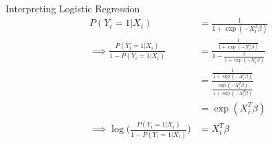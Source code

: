 \documentclass{clbeamer2024}
\begin{document}
\begin{frame}{Interpreting Logistic Regression}
    \begin{equation*}
    \begin{split}
        P(Y_i = 1 | X_i) & = \frac{1}{1 + \exp(-X_i^T \beta)} \\
        \implies \frac{P(Y_i = 1 | X_i)}{1 - P(Y_i = 1 | X_i)} & = 
            \frac{
                \frac{1}{1 + \exp(-X_i^T \beta)}
            }{
                1 - \frac{1}{1 + \exp(-X_i^T \beta)}
            } \\
            & = \frac{
                \frac{1}{1 + \exp(-X_i^T \beta)}
            }{
                \frac{\exp(-X_i^T \beta)}{1 + \exp(-X_i^T \beta)}
            } \\
            & = \exp(X_i^T \beta) \\
        \implies \log \Big( \frac{P(Y_i = 1 | X_i)}{1 - P(Y_i = 1 | X_i)} \Big) & = X_i^T \beta
    \end{split}
    \end{equation*}
\end{frame}
\end{document}
